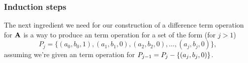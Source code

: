 \begin{comment}
\noindent \underline{\textbf{Subroutine \ld-2'}}\\[4pt]
To compute an \ld term operation for
$\{(a_0,b_0,1), (a_1, b_1, 0)\}$, obviously this is symmetric to
the situation handled in Subroutine LD2 and so the general algorithm
is the same.  Nonetheless, we include a listing of the computational 
steps required so that later we can easily refer to this special case 
of the general algorithm.
\begin{enumerate}[{\bf 1}]
\item Compute $\delta_1=\com{\theta_1}$;
\item form $C_1= \{b_0\}\times a_1/\delta_1 \leq \alg{A}\times\alg{A}$;
\item compute
      $S_1=\Sg^{\alg{A}\times \alg{A}} \{(a_0,a_1),(a_0,b_1),(b_0,b_1)\}$;
\item find a term operation $t$ of $\alg{A}$ satisfying
\[t^{\alg{A}\times\alg{A}}((a_0,a_1),(a_0,b_1),(b_0,b_1)) =
 (t^{\alg{A}}(a_0,a_0,b_0), t^{\alg{A}}(a_1,b_1,b_1)) \in C_1 \cap S_1.\]
\end{enumerate}
Then $t$ is an \ld term operation for
$\{(a_0, b_0, 1), (a_1, b_1, 0)\}$.
\end{comment}



\subsubsection{Induction steps}
\label{sec:induct}

The next ingredient we need for our construction of a 
difference term operation for $\mathbf{A}$ 
is 
a way to produce an \ld
term operation for a set of the form  (for $j>1$)
\begin{equation}
\label{eqn:Pj}
P_j = \{(a_0, b_0, 1), (a_1, b_1, 0), (a_2, b_2, 0), \dots, 
(a_j, b_j, 0)\},
\end{equation}
assuming we're given an \ld term operation for $P_{j-1} = P_{j} - \{(a_j, b_j, 0)\}$.  


\begin{comment}
\noindent \underline{\bf Subroutine \ild-0}\\[4pt]
The input, $p$,  is
an \ld term operation for $P_{j-1} = P_{j} \mysetminus \{(a_j, b_j, 0)\}$.  
\begin{enumerate}[1.]
\item 
Call Subroutine \ld-2 to 
compute an \ld term operation $t$ for the set
\begin{equation*}
\{(a_0, b_0, 1), (a_j, p(a_j, b_j, b_j), 0)\}.
\end{equation*}
\item Return the following 
\ld term operation for $P_j$: 
\begin{equation}
d(x,y,z) = t(x, p(x,y,y), p(x,y,z)).
\label{eq:idl0-dto}
\end{equation}
\end{enumerate}
\qed
\end{comment}





